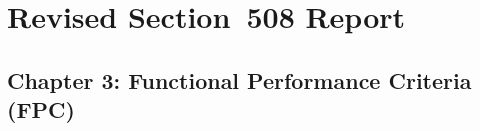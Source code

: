 \documentclass[a4paper]{report}
\begin{document}
\section{Revised Section~508 Report}
\label{sec:sec508}

\subsection{Chapter 3: Functional Performance Criteria (FPC)}
\label{sec:508-3}
\end{document}
